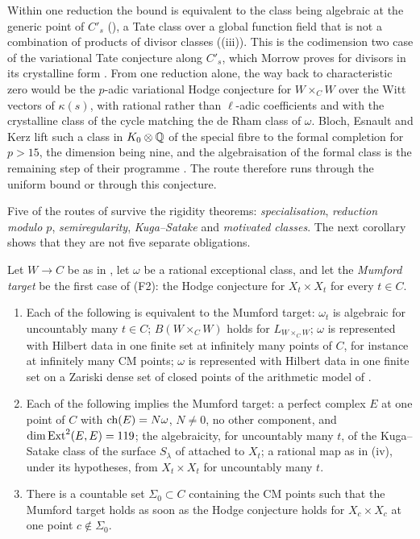 \begin{remark}
Within one reduction the bound is equivalent to the class being algebraic at
the generic point of $C'_{s}$ (), a Tate class over a
global function field that is not a combination of products of divisor
classes ((iii)). This is the codimension two case of the
variational Tate conjecture along $C'_{s}$, which Morrow proves for divisors
in its crystalline form \cite{Mor19}. From one reduction alone, the way back
to characteristic zero would be the $p$-adic variational Hodge conjecture for
$W\times_{C}W$ over the Witt vectors of $\kappa(s)$, with rational rather than
$\ell$-adic coefficients and with the crystalline class of the cycle matching
the de Rham class of $\omega$. Bloch, Esnault and Kerz lift such a class in
$K_{0}\otimes\mathbb{Q}$ of the special fibre to the formal completion for $p>15$,
the dimension being nine, and the algebraisation of the formal class is the
remaining step of their programme \cite[Theorem~1.3]{BEK14}. The route
therefore runs through the uniform bound or through this conjecture.
\end{remark}

Five of the routes of  survive the rigidity theorems:
\emph{specialisation}, \emph{reduction modulo $p$}, \emph{semiregularity},
\emph{Kuga--Satake} and \emph{motivated classes}. The next corollary shows
that they are not five separate obligations.

\begin{corollary}\label{cor:mumfordone}
Let $W\to C$ be as in , let $\omega$ be a rational
exceptional class, and let the \emph{Mumford target} be the first case of
\textup{(F2)}: the Hodge conjecture for $X_{t}\times X_{t}$ for every $t\in C$.
\begin{enumerate}[label=\textup{(\roman*)},leftmargin=2.6em,itemsep=2pt]
\item Each of the following is equivalent to the Mumford target: $\omega_{t}$ is
  algebraic for uncountably many $t\in C$; $B(W\times_{C}W)$ holds for
  $L_{W\times_{C}W}$; $\omega$ is represented with Hilbert data in one finite
  set at infinitely many points of $C$, for instance at infinitely many CM
  points; $\omega$ is represented with Hilbert data in one finite set on a
  Zariski dense set of closed points of the arithmetic model of
  .
\item Each of the following implies the Mumford target: a perfect complex $E$
  at one point of $C$ with $\operatorname{ch}(E)=N\omega$, $N\ne0$, no other component, and
  $\dim\operatorname{Ext}^{2}(E,E)=119$; the algebraicity, for uncountably many $t$, of the
  Kuga--Satake class of the surface $S_{\lambda}$ of 
  attached to $X_{t}$; a rational map as in (iv), under
  its hypotheses, from $X_{t}\times X_{t}$ for uncountably many $t$.
\item There is a countable set $\Sigma_{0}\subset C$ containing the CM points
  such that the Mumford target holds as soon as the Hodge conjecture holds for
  $X_{c}\times X_{c}$ at one point $c\notin\Sigma_{0}$.
\end{enumerate}
\end{corollary}

